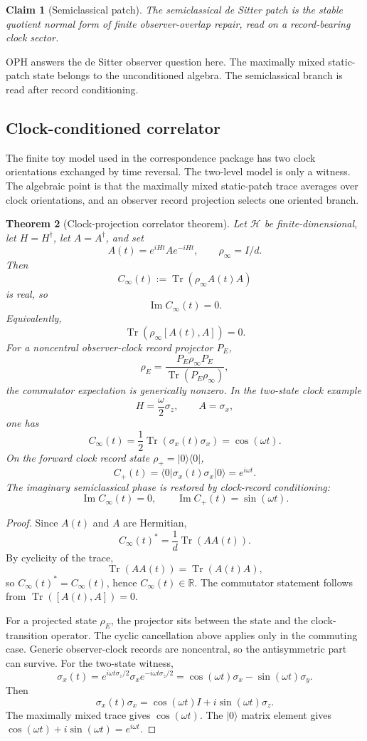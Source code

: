 \documentclass[11pt]{article}
\newtheorem{theorem}{Theorem}[section]
\newtheorem{claim}[theorem]{Claim}
\theoremstyle{remark}
\theoremstyle{plain}
\newcommand{\Tr}{\operatorname{Tr}}
\newcommand{\im}{\operatorname{Im}}
\begin{document}
\begin{claim}[Semiclassical patch]
The semiclassical de Sitter patch is the stable quotient normal form of finite
observer-overlap repair, read on a record-bearing clock sector.
\end{claim}

OPH answers the de Sitter observer question here. The maximally mixed
static-patch state belongs to the unconditioned algebra. The semiclassical branch is read after
record conditioning.

\subsection{Clock-conditioned correlator}

The finite toy model used in the correspondence package has two clock orientations exchanged by
time reversal. The two-level model is only a witness. The algebraic point is that the maximally
mixed static-patch trace averages over clock orientations, and an observer record projection selects
one oriented branch.

\begin{theorem}[Clock-projection correlator theorem]
Let \(\mathcal H\) be finite-dimensional, let \(H=H^\dagger\), let \(A=A^\dagger\), and set
\[
A(t)=e^{iHt}Ae^{-iHt},\qquad \rho_\infty=I/d.
\]
Then
\[
C_\infty(t):=\Tr(\rho_\infty A(t)A)
\]
is real, so
\[
\im C_\infty(t)=0.
\]
Equivalently,
\[
\Tr(\rho_\infty[A(t),A])=0.
\]
For a noncentral observer-clock record projector \(P_E\),
\[
\rho_E=\frac{P_E\rho_\infty P_E}{\Tr(P_E\rho_\infty)},
\]
the commutator expectation is generically nonzero. In the two-state clock example
\[
H=\frac{\omega}{2}\sigma_z,\qquad A=\sigma_x,
\]
one has
\[
C_\infty(t)=\frac12\Tr(\sigma_x(t)\sigma_x)=\cos(\omega t).
\]
On the forward clock record state \(\rho_+=|0\rangle\langle0|\),
\[
C_+(t)=\langle0|\sigma_x(t)\sigma_x|0\rangle=e^{i\omega t}.
\]
The imaginary semiclassical phase is restored by clock-record conditioning:
\[
\im C_\infty(t)=0,\qquad \im C_+(t)=\sin(\omega t).
\]
\end{theorem}

\begin{proof}
Since \(A(t)\) and \(A\) are Hermitian,
\[
C_\infty(t)^*=\frac1d\Tr(A A(t)).
\]
By cyclicity of the trace,
\[
\Tr(A A(t))=\Tr(A(t)A),
\]
so \(C_\infty(t)^*=C_\infty(t)\), hence \(C_\infty(t)\in\mathbb R\). The commutator statement
follows from \(\Tr([A(t),A])=0\).

For a projected state \(\rho_E\), the projector sits between the state and the clock-transition
operator. The cyclic cancellation above applies only in the commuting case. Generic observer-clock
records are noncentral, so the antisymmetric part can survive. For the two-state witness,
\[
\sigma_x(t)=e^{i\omega t\sigma_z/2}\sigma_xe^{-i\omega t\sigma_z/2}
=\cos(\omega t)\sigma_x-\sin(\omega t)\sigma_y.
\]
Then
\[
\sigma_x(t)\sigma_x=\cos(\omega t)I+i\sin(\omega t)\sigma_z.
\]
The maximally mixed trace gives \(\cos(\omega t)\). The \(|0\rangle\) matrix element gives
\(\cos(\omega t)+i\sin(\omega t)=e^{i\omega t}\).
\end{proof}
\end{document}
